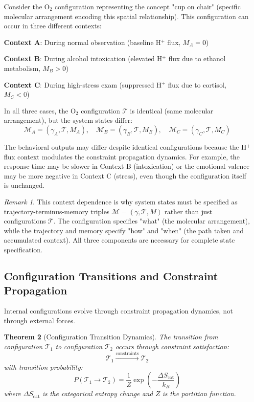 \documentclass[aps,prd,twocolumn,superscriptaddress,floatfix,nofootinbib]{revtex4-2}
\newtheorem{theorem}{Theorem}[section]
\theoremstyle{remark}
\newtheorem{remark}[theorem]{Remark}
\begin{document}
\begin{example}
Consider the O$_2$ configuration representing the concept "cup on chair" (specific molecular arrangement encoding this spatial relationship). This configuration can occur in three different contexts:

\textbf{Context A}: During normal observation (baseline H$^+$ flux, $M_A = 0$)

\textbf{Context B}: During alcohol intoxication (elevated H$^+$ flux due to ethanol metabolism, $M_B > 0$)

\textbf{Context C}: During high-stress exam (suppressed H$^+$ flux due to cortisol, $M_C < 0$)

In all three cases, the O$_2$ configuration $\mathcal{T}$ is identical (same molecular arrangement), but the system states differ:
$$
\mathcal{M}_A = (\gamma_A, \mathcal{T}, M_A), \quad \mathcal{M}_B = (\gamma_B, \mathcal{T}, M_B), \quad \mathcal{M}_C = (\gamma_C, \mathcal{T}, M_C)
$$

The behavioral outputs may differ despite identical configurations because the H$^+$ flux context modulates the constraint propagation dynamics. For example, the response time may be slower in Context B (intoxication) or the emotional valence may be more negative in Context C (stress), even though the configuration itself is unchanged.
\end{example}

\begin{remark}
This context dependence is why system states must be specified as trajectory-terminus-memory triples $\mathcal{M} = (\gamma, \mathcal{T}, M)$ rather than just configurations $\mathcal{T}$. The configuration specifies "what" (the molecular arrangement), while the trajectory and memory specify "how" and "when" (the path taken and accumulated context). All three components are necessary for complete state specification.
\end{remark}

\subsection{Configuration Transitions and Constraint Propagation}

Internal configurations evolve through constraint propagation dynamics, not through external forces.

\begin{theorem}[Configuration Transition Dynamics]
\label{thm:config_transition}
The transition from configuration $\mathcal{T}_1$ to configuration $\mathcal{T}_2$ occurs through constraint satisfaction:
\begin{equation}
\mathcal{T}_1 \xrightarrow{\text{constraints}} \mathcal{T}_2
\end{equation}
with transition probability:
\begin{equation}
P(\mathcal{T}_1 \to \mathcal{T}_2) = \frac{1}{Z} \exp\left(-\frac{\Delta S_{\text{cat}}}{k_B}\right)
\end{equation}
where $\Delta S_{\text{cat}}$ is the categorical entropy change and $Z$ is the partition function.
\end{theorem}
\end{document}
